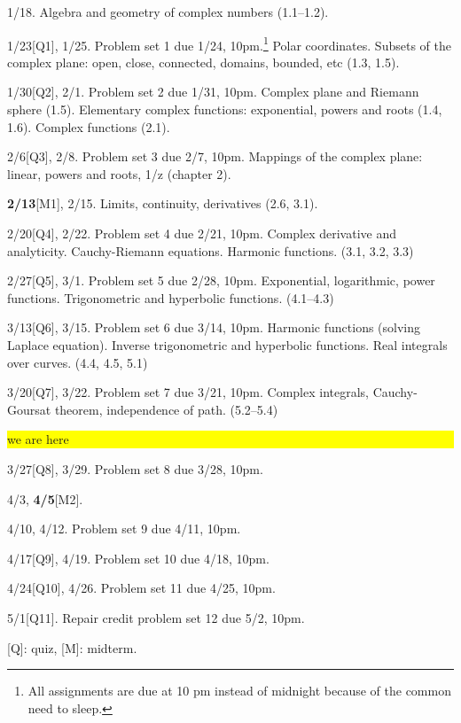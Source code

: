 \documentclass[oneside,11pt]{amsart}
\begin{document}
\begin{enumerate}[\bf{}{[}week 1{]}]
	\item 1/18. Algebra and geometry of complex numbers (1.1--1.2).
	\item 1/23[Q1], 1/25. Problem set 1 due 1/24, 10pm.\footnote{All assignments are due at 10 pm instead of midnight because of the common need to sleep.}
		Polar coordinates. Subsets of the complex plane: open, close, connected, domains, bounded, etc (1.3, 1.5).
	\item 1/30[Q2], 2/1. Problem set 2 due 1/31, 10pm.
		Complex plane and Riemann sphere (1.5).
		Elementary complex functions: exponential, powers and roots (1.4, 1.6).
		Complex functions (2.1).
	\item 2/6[Q3], 2/8. Problem set 3 due 2/7, 10pm.
		Mappings of the complex plane: linear, powers and roots, 1/z (chapter 2).
	\item \textbf{2/13}[M1], 2/15.
		Limits, continuity, derivatives
		(2.6, 3.1).
	\item 2/20[Q4], 2/22. Problem set 4 due 2/21, 10pm.
		Complex derivative and analyticity. Cauchy-Riemann equations.  Harmonic functions.
		(3.1, 3.2, 3.3)
	\item 2/27[Q5], 3/1. Problem set 5 due 2/28, 10pm.
		Exponential, logarithmic, power functions.
		Trigonometric and hyperbolic functions. 
		(4.1--4.3)
	\item 3/13[Q6], 3/15. Problem set 6 due 3/14, 10pm.
		Harmonic functions (solving Laplace equation). 
		Inverse trigonometric and hyperbolic functions. 
		Real integrals over curves.
		(4.4, 4.5, 5.1)
	\item 3/20[Q7], 3/22. Problem set 7 due 3/21, 10pm.
		Complex integrals, Cauchy-Goursat theorem, independence of path.
		(5.2--5.4)

		\colorbox{yellow}{\parbox{.7\textwidth}{we are here}}
	\item 3/27[Q8], 3/29. Problem set 8 due 3/28, 10pm.
	\item 4/3, \textbf{4/5}[M2].
	\item 4/10, 4/12. Problem set 9 due 4/11, 10pm.
	\item 4/17[Q9], 4/19. Problem set 10 due 4/18, 10pm.
	\item 4/24[Q10], 4/26. Problem set 11 due 4/25, 10pm.
	\item 5/1[Q11]. Repair credit problem set 12 due 5/2, 10pm.
\end{enumerate}

\medskip

[Q]: quiz, [M]: midterm.
\end{document}
